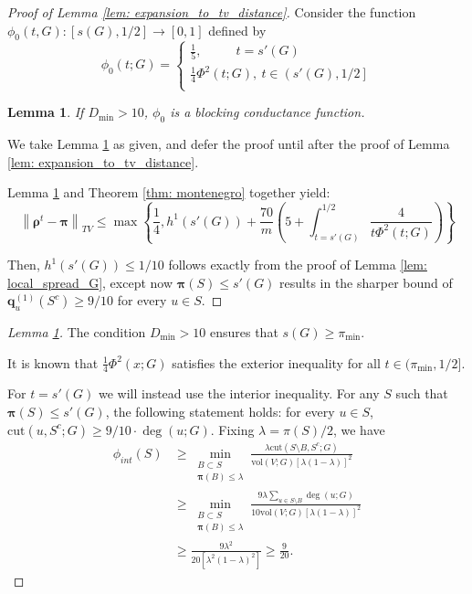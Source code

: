\documentclass{article}
\newcommand{\vol}{\mathrm{vol}}
\newcommand{\norm}[1]{\left\lVert#1\right\rVert}
\newcommand{\1}{\mathbf{1}}
\newcommand{\cut}{\mathrm{cut}}
\newcommand{\qbf}{\mathbf{q}}
\newcommand{\pibf}{\bm{\pi}}
\newcommand{\rhobf}{\bm{\rho}}
\theoremstyle{aldenthm}
\newtheorem{lemma}{Lemma}
\begin{document}
\begin{proof}[Proof of Lemma \ref{lem:  expansion_to_tv_distance}]
	Consider the function $\phi_0(t, G): [s(G), 1/2] \to [0,1]$ defined by
	\begin{equation}
	\label{eqn: local_spread_blocking_conductance_function}
	\phi_0(t; G) = 
	\begin{cases}
	\frac{1}{5}, ~~~~~~~~~~~~ t = s'(G) \\
	\frac{1}{4} \Phi^2(t; G), ~ t \in \left(s'(G), 1/2\right] \\
	\end{cases}
	\end{equation}
	\begin{lemma}
		\label{lem: local_spread_blocking_conductance_function}
		If $D_{\min} > 10$, $\phi_0$ is a blocking conductance function.
	\end{lemma}
	We take Lemma \ref{lem: local_spread_blocking_conductance_function} as given, and defer the proof until after the proof of Lemma \ref{lem: expansion_to_tv_distance}. 
	
	Lemma \ref{lem: local_spread_blocking_conductance_function} and Theorem \ref{thm: montenegro} together yield:
	\begin{equation*}
	\norm{\rhobf^t - \pibf}_{TV} \leq \max\left\{ \frac{1}{4}, h^1(s'(G)) +  \frac{70}{m}\left(5 + \int_{t = s'(G)}^{1/2} \frac{4}{t \Phi^2(t; G)}\right) \right\}
	\end{equation*}
	
	Then, $h^1(s'(G)) \leq 1/10$ follows exactly from the proof of Lemma \ref{lem: local_spread_G}, except now $\pibf(S) \leq s'(G)$ results in the sharper bound of $\qbf_u^{(1)}(S^c) \geq 9/10$ for every $u \in S$.
\end{proof}
\begin{proof}[Lemma \ref{lem: local_spread_blocking_conductance_function}]
	The condition $D_{\min} > 10$ ensures that $s(G) \geq \pi_{\min}$.
	
	It is known that $\frac{1}{4} \Phi^2(x;G)$ satisfies the exterior inequality for all $t \in (\pi_{\min}, 1/2]$.
	
	For $t = s'(G)$ we will instead use the interior inequality. For any $S$ such that $\pibf(S) \leq s'(G)$, the following statement holds: for every $u \in S$, $\cut(u, S^c; G) \geq 9/10 \cdot \deg(u; G)$. 
	Fixing $\lambda = \pi(S)/2$, we have
	\begin{align*}
	\phi_{int}(S) & \geq \min_{\substack{B \subset S \\ \pibf(B) \leq \lambda} } \frac{\lambda \cut(S \setminus B, S^c; G)}{\vol(V; G) \left[\lambda (1 - \lambda)\right]^2} \\
	& \geq  \min_{\substack{B \subset S \\ \pibf(B) \leq \lambda} } \frac{9 \lambda \sum_{u \in S \setminus B} \deg(u; G)}{10 \vol(V; G) \left[\lambda (1 - \lambda)\right]^2} \\
	& \geq \frac{9\lambda^2}{20[\lambda^2(1 - \lambda)^2]} \geq \frac{9}{20}. 
	\end{align*} 
\end{proof}
\end{document}
